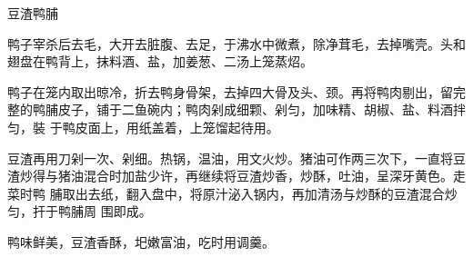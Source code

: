 \begin{recipe}{豆渣鸭脯}

\ingredients



\cooking

\step 鸭子宰杀后去毛，大开去脏腹、去足，于沸水中微煮，除净茸毛，去掉嘴壳。头和
翅盘在鸭背上，抹料酒、盐，加姜葱、二汤上笼蒸炤。

\step 鸭子在笼内取出晾冷，折去鸭身骨架，去掉四大骨及头、颈。再将鸭肉剔出，留完
整的鸭脯皮子，铺于二鱼碗内；鸭肉剁成细颗、剁匀，加味精、胡椒、盐、料酒拌匀，裝
于鸭皮面上，用纸盖着，上笼馏起待用。

\step 豆渣再用刀剁一次、剁细。热锅，温油，用文火炒。猪油可作两三次下，一直将豆
渣炒得与猪油混合时加盐少许，再继续将豆渣炒香，炒酥，吐油，呈深牙黄色。走菜时鸭
脯取出去纸，翻入盘中，将原汁泌入锅内，再加清汤与炒酥的豆渣混合炒匀，扞于鸭脯周
围即成。

\features

鸭味鲜美，豆渣香酥，圯嫩富油，吃时用调羹。

\end{recipe}

